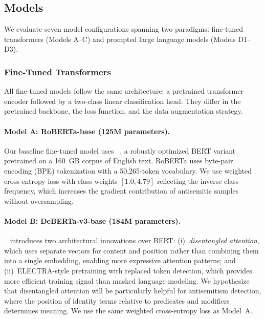 \subsection{Models}
\label{sec:models}

We evaluate seven model configurations spanning two paradigms: fine-tuned transformers (Models A--C) and prompted large language models (Models D1--D3).

\subsubsection{Fine-Tuned Transformers}

All fine-tuned models follow the same architecture: a pretrained transformer encoder followed by a two-class linear classification head. They differ in the pretrained backbone, the loss function, and the data augmentation strategy.

\paragraph{Model A: RoBERTa-base (125M parameters).}
Our baseline fine-tuned model uses \modelA{}~\citep{liu2019roberta}, a robustly optimized BERT variant pretrained on a 160~GB corpus of English text. RoBERTa uses byte-pair encoding (BPE) tokenization with a 50,265-token vocabulary. We use weighted cross-entropy loss with class weights $[1.0, 4.79]$ reflecting the inverse class frequency, which increases the gradient contribution of antisemitic samples without oversampling.

\paragraph{Model B: DeBERTa-v3-base (184M parameters).}
\modelB{}~\citep{he2023debertav3} introduces two architectural innovations over BERT: (i)~\emph{disentangled attention}, which uses separate vectors for content and position rather than combining them into a single embedding, enabling more expressive attention patterns; and (ii)~ELECTRA-style pretraining with replaced token detection, which provides more efficient training signal than masked language modeling. We hypothesize that disentangled attention will be particularly helpful for antisemitism detection, where the position of identity terms relative to predicates and modifiers determines meaning. We use the same weighted cross-entropy loss as Model~A.

